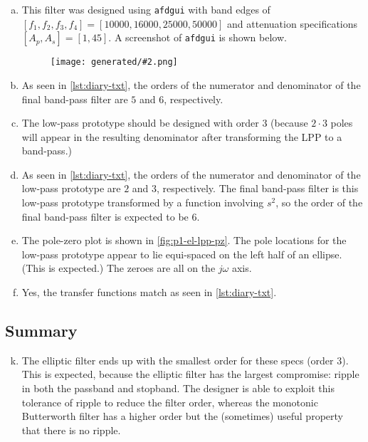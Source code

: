 \documentclass{ajhlabreport}
\newcommand{\generatedfigw}[2]{
	\texttt{[image: generated/\#2.png]}
}
\begin{document}
\begin{enumerate}[(a)]
%
\item This filter was designed using \texttt{afdgui} with band edges of $[ f_1,
f_2, f_3, f_4 ] = [ 10000, 16000, 25000, 50000 ]$ and attenuation specifications
$[ A_p, A_s ] = [ 1, 45 ]$. A screenshot of \texttt{afdgui} is shown below.
\begin{figure}[H]\centering\generatedfigw{0.8}{p1a-el}\end{figure}
%
\item As seen in \autoref{lst:diary-txt}, the orders of the numerator and
denominator of the final band-pass filter are $5$ and $6$, respectively.
%
\item The low-pass prototype should be designed with order $3$ (because $2 \cdot
3$ poles will appear in the resulting denominator after transforming the LPP to
a band-pass.)
%
\item As seen in \autoref{lst:diary-txt}, the orders of the numerator and
denominator of the low-pass prototype are $2$ and $3$, respectively. The final
band-pass filter is this low-pass prototype transformed by a function involving
$s^2$, so the order of the final band-pass filter is expected to be $6$.
%
\item The pole-zero plot is shown in \autoref{fig:p1-el-lpp-pz}. The pole
locations for the low-pass prototype appear to lie equi-spaced on the left half
of an ellipse. (This is expected.) The zeroes are all on the $j\omega$ axis.
%
\setcounter{enumi}{6}
\item Yes, the transfer functions match as seen in \autoref{lst:diary-txt}.
%
\end{enumerate}


\newpage
\subsection{Summary}%

\begin{enumerate}[(a)]
\setcounter{enumi}{10}
\item The elliptic filter ends up with the smallest order for these specs (order
3). This is expected, because the elliptic filter has the largest compromise:
ripple in both the passband and stopband. The designer is able to exploit this
tolerance of ripple to reduce the filter order, whereas the monotonic
Butterworth filter has a higher order but the (sometimes) useful property that
there is no ripple.
\end{enumerate}
\end{document}
